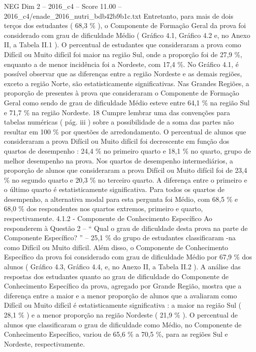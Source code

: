 \begin{textsample}{NEG Dim 2 – 2016\_c4 – Score 11.00 – 2016\_c4/enade\_2016\_nutri\_bdb42b9b1c.txt}
Entretanto, para mais de dois terços dos estudantes ( 68,3 \% ), o Componente de Formação Geral da prova foi considerado com grau de dificuldade Médio ( Gráfico 4.1, Gráfico 4.2 e, no Anexo II, a Tabela II.1 ).
O percentual de estudantes que consideraram a prova como Difícil ou Muito difícil foi maior na região Sul, onde a proporção foi de 27,9 \%, enquanto a de menor incidência foi a Nordeste, com 17,4 \%.
No Gráfico 4.1, é possível observar que as diferenças entre a região Nordeste e as demais regiões, exceto a região Norte, são estatisticamente significativas.
Nas Grandes Regiões, a proporção de presentes à prova que consideraram o Componente de Formação Geral como sendo de grau de dificuldade Médio esteve entre 64,1 \% na região Sul e 71,7 \% na região Nordeste. 18 Cumpre lembrar uma das convenções para tabelas numéricas ( pág. iii ) sobre a possibilidade de a soma das partes não resultar em 100 \% por questões de arredondamento.
O percentual de alunos que consideraram a prova Difícil ou Muito difícil foi decrescente em função dos quartos de desempenho : 24,4 \% no primeiro quarto e 18,1 \% no quarto, grupo de melhor desempenho na prova.
Nos quartos de desempenho intermediários, a proporção de alunos que consideraram a prova Difícil ou Muito difícil foi de 23,4 \% no segundo quarto e 20,3 \% no terceiro quarto.
A diferença entre o primeiro e o último quarto é estatisticamente significativa.
Para todos os quartos de desempenho, a alternativa modal para esta pergunta foi Médio, com 68,5 \% e 68,0 \% dos respondentes nos quartos extremos, primeiro e quarto, respectivamente. 4.1.2 - Componente de Conhecimento Específico Ao responderem à Questão 2 – “ Qual o grau de dificuldade desta prova na parte de Componente Específico? ” – 25,1 \% do grupo de estudantes classificaram -na como Difícil ou Muito difícil.
Além disso, o Componente de Conhecimento Específico da prova foi considerado com grau de dificuldade Médio por 67,9 \% dos alunos ( Gráfico 4.3, Gráfico 4.4, e, no Anexo II, a Tabela II.2 ).
A análise das respostas dos estudantes quanto ao grau de dificuldade do Componente de Conhecimento Específico da prova, agregado por Grande Região, mostra que a diferença entre a maior e a menor proporção de alunos que a avaliaram como Difícil ou Muito difícil é estatisticamente significativa : a maior na região Sul ( 28,1 \% ) e a menor proporção na região Nordeste ( 21,9 \% ).
O percentual de alunos que classificaram o grau de dificuldade como Médio, no Componente de Conhecimento Específico, variou de 65,6 \% a 70,5 \%, para as regiões Sul e Nordeste, respectivamente.

\end{textsample}
